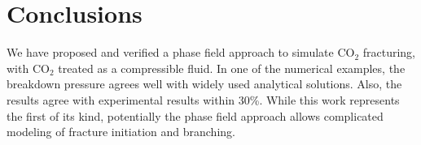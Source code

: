 \section{Conclusions}\label{sec:concl}
We have proposed {and verified} a phase field approach to simulate CO$_2$ fracturing, with CO$_2$ treated as a compressible fluid. {In one of the numerical examples, the} breakdown pressure agrees well with widely used analytical solutions. Also, the results agree with experimental results within 30\%. While this work represents the first of its kind, potentially the phase field approach allows complicated modeling of fracture initiation and branching.